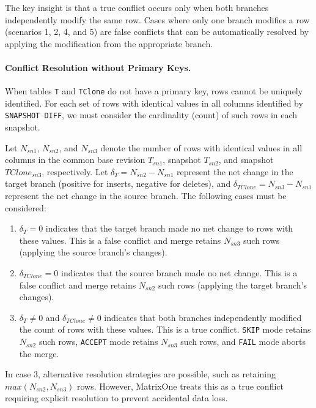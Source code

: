\documentclass[sigconf,nonacm]{acmart} %
\begin{document}
The key insight is that a true conflict occurs only when both branches independently 
modify the same row. Cases where only one branch modifies a row (scenarios 1, 2, 4, and 5) 
are false conflicts that can be automatically resolved by applying the modification from 
the appropriate branch.

\paragraph{Conflict Resolution without Primary Keys.}
When tables \texttt{T} and \texttt{TClone} do not have a primary key,
rows cannot be uniquely identified. For each set of rows with identical values 
in all columns identified by \texttt{SNAPSHOT DIFF}, we must consider the 
cardinality (count) of such rows in each snapshot. 

Let $N_{sn1}$, $N_{sn2}$, and $N_{sn3}$ denote the number of rows with identical 
values in all columns in the common base revision $T_{sn1}$, snapshot $T_{sn2}$, 
and snapshot $TClone_{sn3}$, respectively. Let $\delta_T = N_{sn2} - N_{sn1}$ 
represent the net change in the target branch (positive for inserts, negative for 
deletes), and $\delta_{TClone} = N_{sn3} - N_{sn1}$ represent the net change in 
the source branch. The following cases must be considered:
\begin{enumerate}
\item $\delta_T = 0$ indicates that the target branch 
made no net change to rows with these values. This is a false conflict and 
merge retains $N_{sn3}$ such rows (applying the source branch's changes).

\item $\delta_{TClone} = 0$ indicates that the source 
branch made no net change. This is a false conflict and merge retains $N_{sn2}$ 
such rows (applying the target branch's changes).

\item $\delta_T \neq 0$ and $\delta_{TClone} \neq 0$ 
indicates that both branches independently modified the count of rows with these 
values. This is a true conflict. \texttt{SKIP} mode retains $N_{sn2}$ such rows, 
\texttt{ACCEPT} mode retains $N_{sn3}$ such rows, and \texttt{FAIL} mode aborts the merge.
\end{enumerate}

In case 3, alternative resolution strategies are possible, such as retaining 
$max(N_{sn2}, N_{sn3})$ rows. However, MatrixOne treats this as a true conflict 
requiring explicit resolution to prevent accidental data loss.
\end{document}
